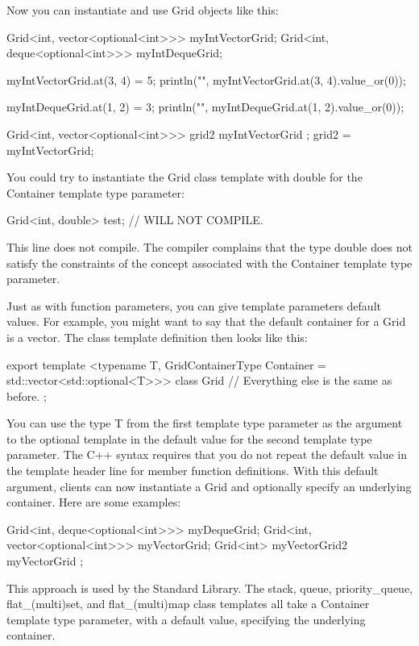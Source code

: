 Now you can instantiate and use Grid objects like this:

\begin{cpp}
Grid<int, vector<optional<int>>> myIntVectorGrid;
Grid<int, deque<optional<int>>> myIntDequeGrid;

myIntVectorGrid.at(3, 4) = 5;
println("{}", myIntVectorGrid.at(3, 4).value_or(0));

myIntDequeGrid.at(1, 2) = 3;
println("{}", myIntDequeGrid.at(1, 2).value_or(0));

Grid<int, vector<optional<int>>> grid2 { myIntVectorGrid };
grid2 = myIntVectorGrid;
\end{cpp}

You could try to instantiate the Grid class template with double for the Container template type parameter:

\begin{cpp}
Grid<int, double> test; // WILL NOT COMPILE.
\end{cpp}

This line does not compile. The compiler complains that the type double does not satisfy the constraints of the concept associated with the Container template type parameter.

Just as with function parameters, you can give template parameters default values. For example, you might want to say that the default container for a Grid is a vector. The class template definition then looks like this:

\begin{cpp}
export template <typename T,
    GridContainerType Container = std::vector<std::optional<T>>>
class Grid
{
    // Everything else is the same as before.
};
\end{cpp}

You can use the type T from the first template type parameter as the argument to the optional template in the default value for the second template type parameter. The C++ syntax requires that you do not repeat the default value in the template header line for member function definitions. With this default argument, clients can now instantiate a Grid and optionally specify an underlying container. Here are some examples:

\begin{cpp}
Grid<int, deque<optional<int>>> myDequeGrid;
Grid<int, vector<optional<int>>> myVectorGrid;
Grid<int> myVectorGrid2 { myVectorGrid };
\end{cpp}

This approach is used by the Standard Library. The stack, queue, priority\_queue, flat\_(multi)set, and flat\_(multi)map class templates all take a Container template type parameter, with a default value, specifying the underlying container.

